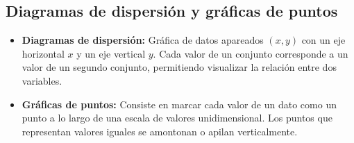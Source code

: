 \subsection{Diagramas de dispersión y gráficas de puntos}
\begin{itemize}
    \item \textbf{Diagramas de dispersión:} Gráfica de datos apareados $(x, y)$ con un eje horizontal $x$ y un eje vertical $y$. Cada valor de un conjunto corresponde a un valor de un segundo conjunto, permitiendo visualizar la relación entre dos variables.
    \item \textbf{Gráficas de puntos:} Consiste en marcar cada valor de un dato como un punto a lo largo de una escala de valores unidimensional. Los puntos que representan valores iguales se amontonan o apilan verticalmente.
\end{itemize}